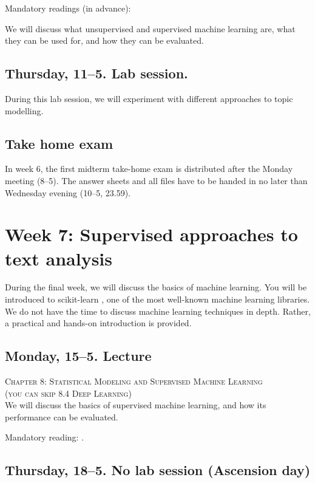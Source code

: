 Mandatory readings (in advance): \cite{Maier2018a}

We will discuss what unsupervised and supervised machine learning are, what they can be used for, and how they can be evaluated.

\subsection*{Thursday, 11--5. Lab session.}

During this lab session, we will experiment with different approaches to topic modelling. 

\subsection*{Take home exam}
In week 6, the first midterm take-home exam is distributed after the Monday meeting (8--5). The answer sheets and all files have to be handed in no later than Wednesday evening (10--5, 23.59).

\section*{Week 7: Supervised approaches to text analysis}

During the final week, we will discuss the basics of machine learning. You will be introduced to scikit-learn \citep{scikit-learn}, one of the most well-known machine learning libraries. We do not have the time to discuss machine learning techniques in depth. Rather, a practical and hands-on introduction is provided. 

\subsection*{Monday, 15--5. Lecture}
\textsc{ Chapter 8: Statistical Modeling and Supervised Machine Learning}\\
\textsc{ (you can skip 8.4 Deep Learning)}\\

We will discuss the basics of supervised machine learning, and how its performance can be evaluated. 


Mandatory reading: \cite{Boumans2016}.

\subsection*{Thursday, 18--5. No lab session (Ascension day)}


